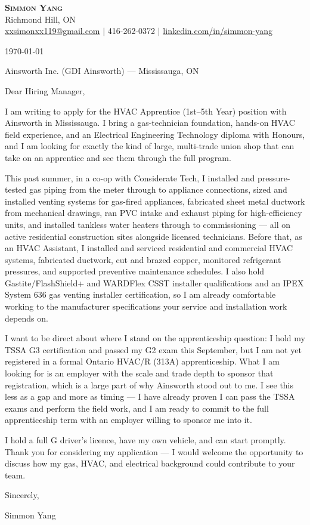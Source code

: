 \documentclass[letterpaper,11pt]{article}
\begin{document}
\begin{center}
    \textbf{\Huge \scshape Simmon Yang} \\ \vspace{1pt}
    Richmond Hill, ON \\
    \href{mailto:xxsimonxx119@gmail.com}{xxsimonxx119@gmail.com} $|$ 416-262-0372 $|$
    \href{https://www.linkedin.com/in/simmon-yang/}{linkedin.com/in/simmon-yang}
\end{center}

\vspace{10pt}

\today

Ainsworth Inc. (GDI Ainsworth) --- Mississauga, ON

Dear Hiring Manager,

I am writing to apply for the HVAC Apprentice (1st--5th Year) position with Ainsworth in Mississauga. I bring a gas-technician foundation, hands-on HVAC field experience, and an Electrical Engineering Technology diploma with Honours, and I am looking for exactly the kind of large, multi-trade union shop that can take on an apprentice and see them through the full program.

This past summer, in a co-op with Considerate Tech, I installed and pressure-tested gas piping from the meter through to appliance connections, sized and installed venting systems for gas-fired appliances, fabricated sheet metal ductwork from mechanical drawings, ran PVC intake and exhaust piping for high-efficiency units, and installed tankless water heaters through to commissioning --- all on active residential construction sites alongside licensed technicians. Before that, as an HVAC Assistant, I installed and serviced residential and commercial HVAC systems, fabricated ductwork, cut and brazed copper, monitored refrigerant pressures, and supported preventive maintenance schedules. I also hold Gastite/FlashShield+ and WARDFlex CSST installer qualifications and an IPEX System 636 gas venting installer certification, so I am already comfortable working to the manufacturer specifications your service and installation work depends on.

I want to be direct about where I stand on the apprenticeship question: I hold my TSSA G3 certification and passed my G2 exam this September, but I am not yet registered in a formal Ontario HVAC/R (313A) apprenticeship. What I am looking for is an employer with the scale and trade depth to sponsor that registration, which is a large part of why Ainsworth stood out to me. I see this less as a gap and more as timing --- I have already proven I can pass the TSSA exams and perform the field work, and I am ready to commit to the full apprenticeship term with an employer willing to sponsor me into it.

I hold a full G driver's licence, have my own vehicle, and can start promptly. Thank you for considering my application --- I would welcome the opportunity to discuss how my gas, HVAC, and electrical background could contribute to your team.

Sincerely,

Simmon Yang
\end{document}
